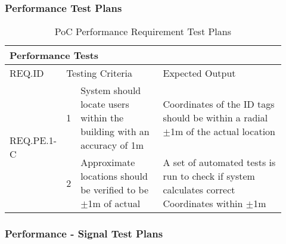 
\subsubsection{Performance Test Plans}
\begin{table}[h!]
    \centering
    
    \begin{tabular}{|m{0.15\linewidth}|m{0.02\linewidth}|m{0.3\linewidth}|m{0.45\linewidth}|} 
    \hline
    \multicolumn{4}{|l|}{Performance Tests    }      \\ 
    \hline
    REQ.ID      & \multicolumn{2}{l|}{Testing Criteria}      & Expected Output          \\ 
    \hline
    \multirow{2}{*}{REQ.PE.1-C} & 1 
    & System should locate users within the building with an accuracy of 1m
    & Coordinates of the ID tags should be within a radial $\pm$1m of the actual location    \\ 
    \cline{2-4}
    & 2 
    & Approximate locations should be verified to be $\pm$1m of actual 
    & A set of automated tests is run to check if system calculates correct Coordinates 
    within $\pm$1m  \\
    \hline 
\end{tabular}
\caption{PoC Performance Requirement Test Plans}
\end{table}

\break
\subsubsection{Performance - Signal Test Plans}

